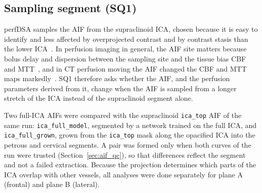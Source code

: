 %
%

\subsection{Sampling segment (SQ1)}
\label{sec:sq1_methods}

perfDSA samples the AIF from the supraclinoid ICA, chosen because it is easy to identify and less affected by
overprojected contrast and by contrast stasis than the lower ICA~\cite{su2025perfdsa}. In perfusion imaging in
general, the AIF site matters because bolus delay and dispersion between the sampling site and the tissue bias
CBF and MTT~\cite{calamante2000,calamante2013}, and in CT perfusion moving the AIF changed the CBF and MTT maps
markedly~\cite{ferreira2010}. SQ1 therefore asks whether the AIF, and the perfusion parameters derived from it,
change when the AIF is sampled from a longer stretch of the ICA instead of the supraclinoid segment alone.

Two full-ICA AIFs were compared with the supraclinoid \texttt{ica\_top} AIF of the same run:
\texttt{ica\_full\_model}, segmented by a network trained on the full ICA, and \texttt{ica\_full\_grown}, grown from
the \texttt{ica\_top} mask along the opacified ICA into the petrous and cervical segments. A pair was formed only
when both curves of the run were trusted (Section~\ref{sec:aif_qc}), so that differences reflect the segment and
not a failed extraction. Because the projection determines which parts of the ICA overlap with other vessels,
all analyses were done separately for plane A (frontal) and plane B (lateral).

